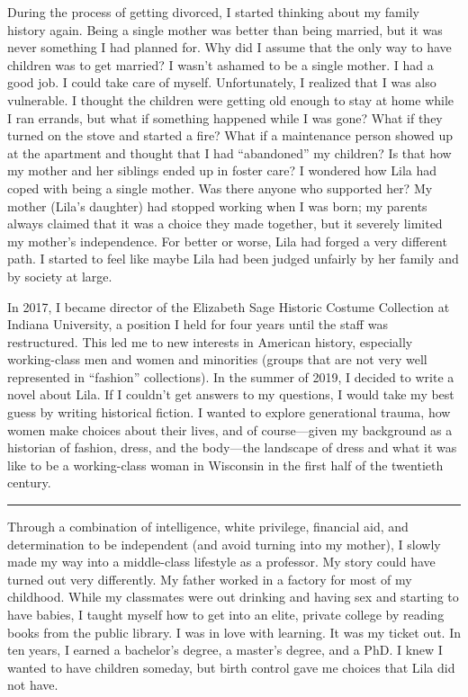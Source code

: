 \documentclass[
  letterpaper,
]{book}
\begin{document}
During the process of getting divorced, I started thinking about my
family history again. Being a single mother was better than being
married, but it was never something I had planned for. Why did I assume
that the only way to have children was to get married? I wasn't ashamed
to be a single mother. I had a good job. I could take care of myself.
Unfortunately, I realized that I was also vulnerable. I thought the
children were getting old enough to stay at home while I ran errands,
but what if something happened while I was gone? What if they turned on
the stove and started a fire? What if a maintenance person showed up at
the apartment and thought that I had ``abandoned'' my children? Is that
how my mother and her siblings ended up in foster care? I wondered how
Lila had coped with being a single mother. Was there anyone who
supported her? My mother (Lila's daughter) had stopped working when I
was born; my parents always claimed that it was a choice they made
together, but it severely limited my mother's independence. For better
or worse, Lila had forged a very different path. I started to feel like
maybe Lila had been judged unfairly by her family and by society at
large.

In 2017, I became director of the Elizabeth Sage Historic Costume
Collection at Indiana University, a position I held for four years until
the staff was restructured. This led me to new interests in American
history, especially working-class men and women and minorities (groups
that are not very well represented in ``fashion'' collections). In the
summer of 2019, I decided to write a novel about Lila. If I couldn't get
answers to my questions, I would take my best guess by writing
historical fiction. I wanted to explore generational trauma, how women
make choices about their lives, and of course---given my background as a
historian of fashion, dress, and the body---the landscape of dress and
what it was like to be a working-class woman in Wisconsin in the first
half of the twentieth century.

\begin{center}\rule{0.5\linewidth}{0.5pt}\end{center}

Through a combination of intelligence, white privilege, financial aid,
and determination to be independent (and avoid turning into my mother),
I slowly made my way into a middle-class lifestyle as a professor. My
story could have turned out very differently. My father worked in a
factory for most of my childhood. While my classmates were out drinking
and having sex and starting to have babies, I taught myself how to get
into an elite, private college by reading books from the public library.
I was in love with learning. It was my ticket out. In ten years, I
earned a bachelor's degree, a master's degree, and a PhD. I knew I
wanted to have children someday, but birth control gave me choices that
Lila did not have.
\end{document}
